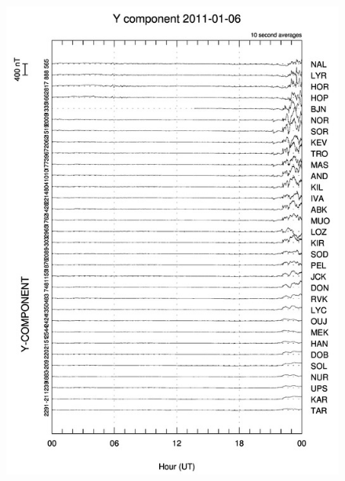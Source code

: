 \documentclass[norsk,a4paper,12pt]{article}
\begin{document}
\begin{figure}[H]
\includegraphics[scale = 0.9]{Figures/Y_gram.jpg}

\end{figure}
\end{document}
